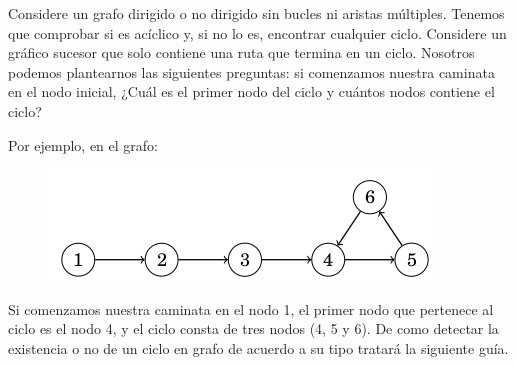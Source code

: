 Considere un grafo dirigido o no dirigido sin bucles ni aristas múltiples. Tenemos que comprobar si es acíclico y, si no lo es, encontrar cualquier ciclo. Considere un gráfico sucesor que solo contiene una ruta que termina en un ciclo. Nosotros podemos plantearnos las siguientes preguntas: si comenzamos nuestra caminata en el nodo inicial, ¿Cuál es el primer nodo del ciclo y cuántos nodos contiene el ciclo?

Por ejemplo, en el grafo:

\begin{figure}[h!]
	\centering
	\includegraphics[width=0.7\linewidth]{img/cycle_detection}
	\label{fig:cycledetection}
\end{figure}


Si comenzamos nuestra caminata en el nodo 1, el primer nodo que pertenece al ciclo es el nodo 4,
y el ciclo consta de tres nodos (4, 5 y 6). De como detectar la existencia o no de un ciclo en grafo de acuerdo a su tipo tratará la siguiente guía.